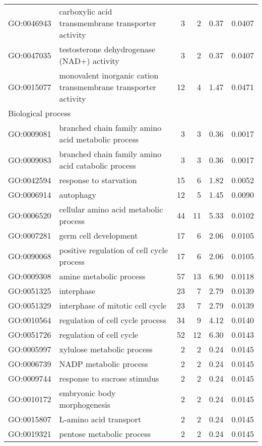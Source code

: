\begin{longtable}{lp{4.5cm}rrrl}
  GO:0046943 & carboxylic acid transmembrane transporter activity &   3 &   2 & 0.37 & 0.0407 \\ 
  GO:0047035 & testosterone dehydrogenase (NAD+) activity &   3 &   2 & 0.37 & 0.0407 \\ 
  GO:0015077 & monovalent inorganic cation transmembrane transporter activity &  12 &   4 & 1.47 & 0.0471 \\ 
  \hline
   \multicolumn{6}{l}{Biological process}  \\ 
   GO:0009081 & branched chain family amino acid metabolic process &   3 &   3 & 0.36 & 0.0017 \\ 
  GO:0009083 & branched chain family amino acid catabolic process &   3 &   3 & 0.36 & 0.0017 \\ 
  GO:0042594 & response to starvation &  15 &   6 & 1.82 & 0.0052 \\ 
  GO:0006914 & autophagy &  12 &   5 & 1.45 & 0.0090 \\ 
  GO:0006520 & cellular amino acid metabolic process &  44 &  11 & 5.33 & 0.0102 \\ 
  GO:0007281 & germ cell development &  17 &   6 & 2.06 & 0.0105 \\ 
  GO:0090068 & positive regulation of cell cycle process &  17 &   6 & 2.06 & 0.0105 \\ 
  GO:0009308 & amine metabolic process &  57 &  13 & 6.90 & 0.0118 \\ 
  GO:0051325 & interphase &  23 &   7 & 2.79 & 0.0139 \\ 
  GO:0051329 & interphase of mitotic cell cycle &  23 &   7 & 2.79 & 0.0139 \\ 
    GO:0010564 & regulation of cell cycle process &  34 &   9 & 4.12 & 0.0140 \\ 
  GO:0051726 & regulation of cell cycle &  52 &  12 & 6.30 & 0.0143 \\ 
  GO:0005997 & xylulose metabolic process &   2 &   2 & 0.24 & 0.0145 \\ 
  GO:0006739 & NADP metabolic process &   2 &   2 & 0.24 & 0.0145 \\ 
  GO:0009744 & response to sucrose stimulus &   2 &   2 & 0.24 & 0.0145 \\ 
  GO:0010172 & embryonic body morphogenesis &   2 &   2 & 0.24 & 0.0145 \\ 
  GO:0015807 & L-amino acid transport &   2 &   2 & 0.24 & 0.0145 \\ 
  GO:0019321 & pentose metabolic process &   2 &   2 & 0.24 & 0.0145 \\ 

\end{longtable}
